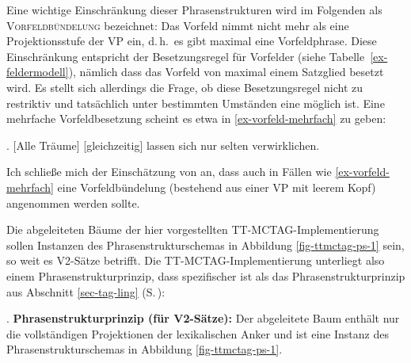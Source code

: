 Eine wichtige Einschränkung dieser Phrasenstrukturen wird im Folgenden als \textsc{Vorfeldbündelung} bezeichnet: Das Vorfeld nimmt nicht mehr als eine Projektionsstufe der VP ein, d.\,h.\ es gibt maximal eine Vorfeldphrase. Diese Einschränkung entspricht der  Besetzungsregel für Vorfelder (siehe Tabelle~\ref{ex-feldermodell}), nämlich dass das Vorfeld von maximal einem Satzglied besetzt wird. Es stellt sich allerdings die Frage, ob diese Besetzungsregel nicht zu restriktiv und tatsächlich unter bestimmten Umständen eine  möglich ist. Eine mehrfache Vorfeldbesetzung scheint es etwa in \ref{ex-vorfeld-mehrfach} zu geben:

\ex.  [Alle Träume] [gleichzeitig] lassen sich nur selten verwirklichen.\\
\citep[(3b)]{Mueller:05b}\label{ex-vorfeld-mehrfach}

Ich schließe mich der Einschätzung von \cite{Mueller:03,Mueller:05b} an, dass auch in Fällen wie \ref{ex-vorfeld-mehrfach} eine Vorfeldbündelung (bestehend aus einer VP mit leerem Kopf) angenommen werden sollte.



Die abgeleiteten Bäume der hier vorgestellten TT-MCTAG-Implementierung sollen Instanzen des Phrasenstrukturschemas in Abbildung \ref{fig-ttmctag-ps-1} sein, so weit es V2-Sätze betrifft. Die TT-MCTAG-Implementierung unterliegt also einem Phrasenstrukturprinzip, dass spezifischer ist als das Phrasenstrukturprinzip aus Abschnitt \ref{sec-tag-ling} (S.\,\pageref{ex-psprinzip-1}):

\ex. \label{ex-psprinzip} {\bf Phrasenstrukturprinzip (für V2-Sätze):}
Der abgeleitete Baum enthält nur die vollständigen Projektionen der lexikalischen Anker und ist eine Instanz des Phrasenstrukturschemas in Abbildung \ref{fig-ttmctag-ps-1}. 

